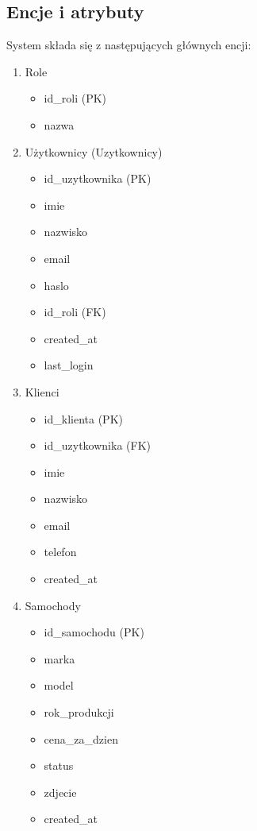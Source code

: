 \documentclass[12pt]{article}
\begin{document}
\subsection{Encje i atrybuty}
System składa się z następujących głównych encji:

\begin{enumerate}
    \item Role
    \begin{itemize}
        \item id\_roli (PK)
        \item nazwa
    \end{itemize}

    \item Użytkownicy (Uzytkownicy)
    \begin{itemize}
        \item id\_uzytkownika (PK)
        \item imie
        \item nazwisko
        \item email
        \item haslo
        \item id\_roli (FK)
        \item created\_at
        \item last\_login
    \end{itemize}

    \item Klienci
    \begin{itemize}
        \item id\_klienta (PK)
        \item id\_uzytkownika (FK)
        \item imie
        \item nazwisko
        \item email
        \item telefon
        \item created\_at
    \end{itemize}

    \item Samochody
    \begin{itemize}
        \item id\_samochodu (PK)
        \item marka
        \item model
        \item rok\_produkcji
        \item cena\_za\_dzien
        \item status
        \item zdjecie
        \item created\_at
    \end{itemize}


\end{enumerate}
\end{document}
